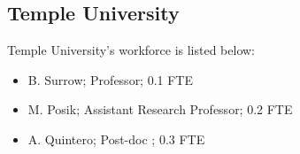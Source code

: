 \subsection{Temple University} 
Temple University's workforce is listed below:
\begin{itemize}
\item B. Surrow; Professor; 0.1 FTE
\item M. Posik; Assistant Research Professor; 0.2 FTE
\item A. Quintero; Post-doc ; 0.3 FTE
\end{itemize}